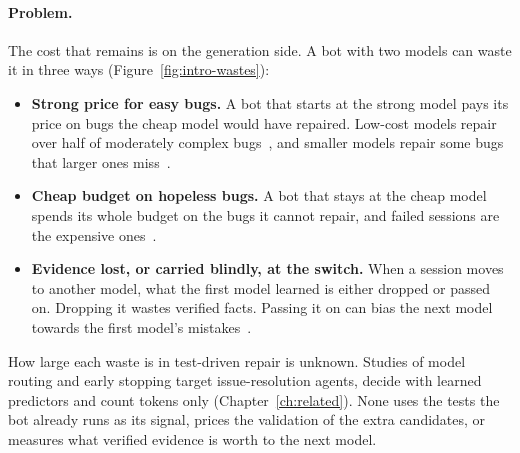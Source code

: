 \paragraph{Problem.} The cost that remains is on the generation side. A bot
with two models can waste it in three ways (Figure~\ref{fig:intro-wastes}):
\begin{itemize}
\item \textbf{Strong price for easy bugs.} A bot that starts at the strong
model pays its price on bugs the cheap model would have repaired. Low-cost
models repair over half of moderately complex
bugs~\citep{liu2026rethinking}, and smaller models repair some bugs that
larger ones miss~\citep{sun2025empirical}.
\item \textbf{Cheap budget on hopeless bugs.} A bot that stays at the cheap
model spends its whole budget on the bugs it cannot repair, and failed
sessions are the expensive ones~\citep{fan2025sweeffi}.
\item \textbf{Evidence lost, or carried blindly, at the switch.} When a
session moves to another model, what the first model learned is either
dropped or passed on. Dropping it wastes verified facts. Passing it on can
bias the next model towards the first model's
mistakes~\citep{son2026swerouter,ning2026revision}.
\end{itemize}
How large each waste is in test-driven repair is unknown. Studies of model
routing and early stopping target issue-resolution agents, decide with learned
predictors and count tokens only (Chapter~\ref{ch:related}). None uses the
tests the bot already runs as its signal, prices the validation of the extra
candidates, or measures what verified evidence is worth to the next model.

